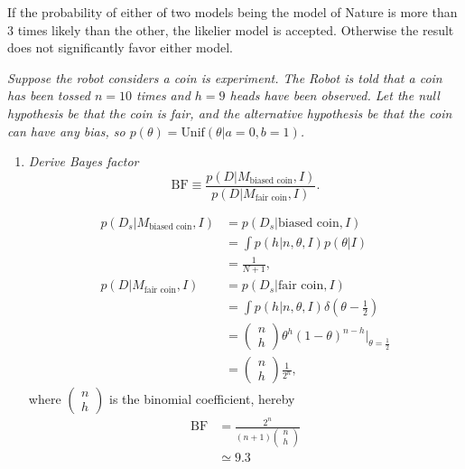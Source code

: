 	\begin{definition}
		If the probability of either of two models being the model of Nature is more than 3 times likely than the other, the likelier model is accepted. Otherwise the result does not significantly favor either model.
	\end{definition}

	\begin{example}
		\emph{Suppose the robot considers a coin is experiment. The Robot is told that a coin has been tossed $n=10$ times and $h=9$ heads have been observed. Let the null hypothesis be that the coin is fair, and the alternative hypothesis be that the coin can have any bias, so $p(\theta) = \text{Unif}(\theta|a=0,b=1)$.}\newline
				
		\begin{enumerate}
			\item \emph{Derive Bayes factor}
			\begin{equation}
				\text{BF}\equiv \frac{p(D|M_\text{biased coin},I)}{p(D|M_\text{fair coin},I)}.
			\end{equation}
			
			\begin{equation}
				\begin{split}
					p(D_s|M_\text{biased coin},I) &= p(D_s|\text{biased coin},I)\\
					&=\int p(h|n,\theta,I)p(\theta|I)\\
					&=\frac{1}{N+1},\\
					p(D|M_\text{fair coin},I) &= p(D_s|\text{fair coin},I)\\
					&=\int p(h|n,\theta,I)\delta(\theta-\frac{1}{2})\\
					&=\begin{pmatrix}
						n\\
						h
					\end{pmatrix}\theta^h(1-\theta)^{n-h}|_{\theta=\frac{1}{2}}\\
					& = \begin{pmatrix}
						n\\
						h
					\end{pmatrix}\frac{1}{2^n},
				\end{split}
			\end{equation}
			where $\begin{pmatrix}
				n\\
				h
			\end{pmatrix}$ is the binomial coefficient,	hereby
			\begin{equation}
				\begin{split}
					\text{BF} &= \frac{2^n}{(n+1)\begin{pmatrix}
							n\\
							h
					\end{pmatrix}}\\
					&\simeq 9.3
				\end{split}
			\end{equation}
			

\end{enumerate}
\end{example}
